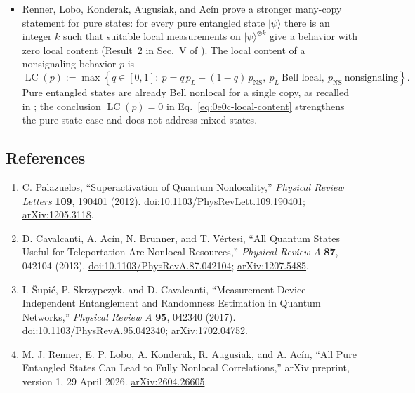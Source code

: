 \begin{itemize}
  \item Renner, Lobo, Konderak, Augusiak, and Ac\'in prove a stronger many-copy
  statement for pure states: for every pure entangled state $|\psi\rangle$
  there is an integer $k$ such that suitable local measurements on
  $|\psi\rangle^{\otimes k}$ give a behavior with zero local content (Result~2
  in Sec.~V of ).  The local content of a
  nonsignaling behavior $p$ is
  \begin{equation}
    \operatorname{LC}(p):=\max\left\{q\in[0,1]:\
    p=q\,p_L+(1-q)\,p_{\mathrm{NS}},\
    p_L\ \text{Bell local},\ p_{\mathrm{NS}}\ \text{nonsignaling}\right\}.
    \label{eq:0e0c-local-content}
  \end{equation}
  Pure entangled states are already Bell nonlocal for a single copy, as
  recalled in ; the conclusion
  $\operatorname{LC}(p)=0$ in Eq.~\eqref{eq:0e0c-local-content} strengthens
  the pure-state case and does not address mixed states.
\end{itemize}

\subsection*{References}

\begin{enumerate}[label={},leftmargin=4.8em,labelsep=0.5em]
  \footnotesize
  \item[\textup{[Pal12]}]\label{ref:0e0c-pal}
  C. Palazuelos, ``Superactivation of Quantum Nonlocality,''
  \emph{Physical Review Letters} \textbf{109}, 190401 (2012).
  \href{https://doi.org/10.1103/PhysRevLett.109.190401}{doi:10.1103/PhysRevLett.109.190401};
  \href{https://arxiv.org/abs/1205.3118}{arXiv:1205.3118}.

  \item[\textup{[CABV13]}]\label{ref:0e0c-cabv}
  D. Cavalcanti, A. Ac\'in, N. Brunner, and T. V\'ertesi, ``All Quantum
  States Useful for Teleportation Are Nonlocal Resources,'' \emph{Physical
  Review A} \textbf{87}, 042104 (2013).
  \href{https://doi.org/10.1103/PhysRevA.87.042104}{doi:10.1103/PhysRevA.87.042104};
  \href{https://arxiv.org/abs/1207.5485}{arXiv:1207.5485}.

  \item[\textup{[SSC17]}]\label{ref:0e0c-ssc}
  I. \v{S}upi\'c, P. Skrzypczyk, and D. Cavalcanti,
  ``Measurement-Device-Independent Entanglement and Randomness Estimation in
  Quantum Networks,'' \emph{Physical Review A} \textbf{95}, 042340 (2017).
  \href{https://doi.org/10.1103/PhysRevA.95.042340}{doi:10.1103/PhysRevA.95.042340};
  \href{https://arxiv.org/abs/1702.04752}{arXiv:1702.04752}.

  \item[\textup{[RLKAA26]}]\label{ref:0e0c-rlkaa}
  M. J. Renner, E. P. Lobo, A. Konderak, R. Augusiak, and A. Ac\'in, ``All
  Pure Entangled States Can Lead to Fully Nonlocal Correlations,'' arXiv
  preprint, version 1, 29 April 2026.
  \href{https://arxiv.org/abs/2604.26605}{arXiv:2604.26605}.
\end{enumerate}

